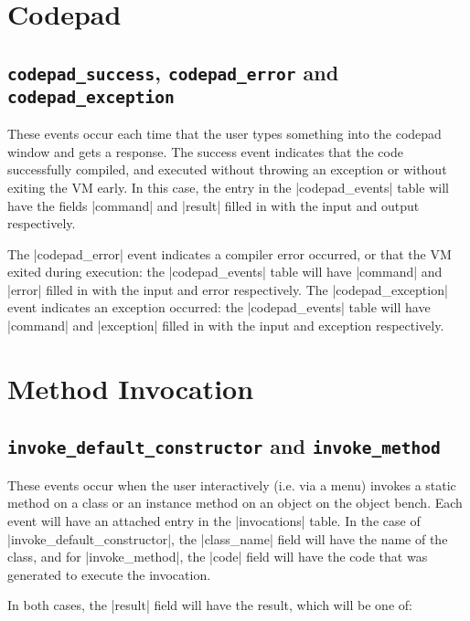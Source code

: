 \documentclass{book}
\begin{document}
\section{Codepad}


\subsection{\lstinline|codepad_success|, \lstinline|codepad_error| and
  \lstinline|codepad_exception|}

These events occur each time that the user types something into the codepad
window and gets a response.  The success event indicates that the code
successfully compiled, and executed without throwing an exception or without
exiting the VM early.  In this case, the entry in the |codepad_events| table
will have the fields |command| and |result| filled in with the input and
output respectively.

The |codepad_error| event indicates a compiler error occurred, or that the VM
exited during execution: the
|codepad_events| table will have |command| and |error| filled in with the
input and error respectively.  The |codepad_exception| event indicates an exception occurred: the
|codepad_events| table will have |command| and |exception| filled in with the
input and exception respectively.

\section{Method Invocation}


\subsection{\lstinline|invoke_default_constructor| and
  \lstinline|invoke_method|}

These events occur when the user interactively (i.e. via a menu) invokes a
static method on a class or an instance method on an object on the object
bench.  Each event will have an attached entry in the |invocations| table.
In the case of |invoke_default_constructor|, the |class_name| field will have
the name of the class, and for |invoke_method|, the |code| field will have the
code that was generated to execute the invocation.

In both cases, the |result| field will have the result, which will be one of:
\end{document}
